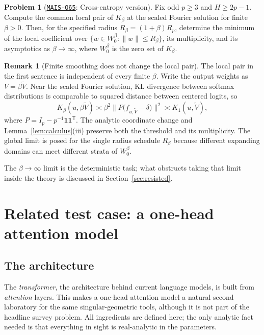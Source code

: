 \documentclass[11pt]{amsart}
\newcommand{\Oid}[1]{\href{https://github.com/lionellevine/MAIS/blob/main/open-problems/MAIS-O#1.md}{\texttt{MAIS-O#1}}}
\theoremstyle{plain}
\theoremstyle{definition}
\newtheorem{problem}[theorem]{Problem}
\newtheorem{remark}[theorem]{Remark}
\begin{document}
\begin{problem}[\Oid{65}: Cross-entropy version]\label{prob:xent}
Fix odd $p \ge 3$ and $H \ge 2p-1$. Compute the common local pair of $K_\beta$ at the scaled Fourier solution for finite $\beta>0$. Then, for the specified radius $R_\beta=(1+\beta)R_p$, determine the minimum of the local coefficient over $\{w\in W_0^\beta:\|w\|\le R_\beta\}$, its multiplicity, and its asymptotics as $\beta\to\infty$, where $W_0^\beta$ is the zero set of $K_\beta$.
\end{problem}

\begin{remark}[Finite smoothing does not change the local pair]
The local pair in the first sentence is independent of every finite $\beta$. Write the output weights as $V=\beta\widetilde V$. Near the scaled Fourier solution, KL divergence between softmax distributions is comparable to squared distance between centered logits, so
\[
 K_\beta(u,\beta\widetilde V)\asymp
 \beta^2\bigl\|P\bigl(f_{u,\widetilde V}-\delta\bigr)\bigr\|^2
 \asymp K_1(u,\widetilde V),
\]
where $P=I_p-p^{-1}\mathbf1\mathbf1^{\mathsf T}$. The analytic coordinate change and Lemma~\ref{lem:calculus}(iii) preserve both the threshold and its multiplicity. The global limit is posed for the single radius schedule $R_\beta$ because different expanding domains can meet different strata of $W_0^\beta$.
\end{remark}

The $\beta \to \infty$ limit is the deterministic task; what obstructs taking that limit inside the theory is discussed in Section~\ref{sec:resisted}.

\section{Related test case: a one-head attention model}\label{sec:attention}

\subsection{The architecture}

The \emph{transformer}, the architecture behind current language models, is built from \emph{attention} layers. This makes a one-head attention model a natural second laboratory for the same singular-geometric tools, although it is not part of the headline survey problem. All ingredients are defined here; the only analytic fact needed is that everything in sight is real-analytic in the parameters.
\end{document}
